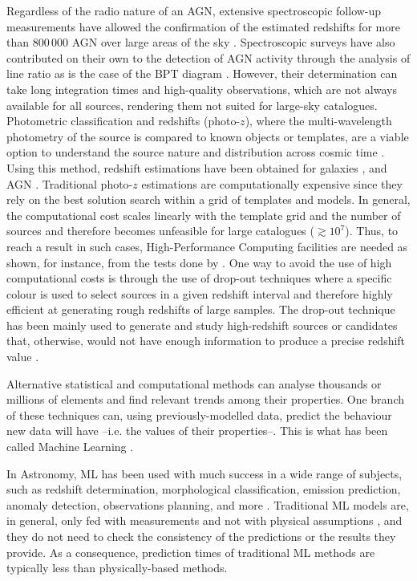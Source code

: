 \documentclass{aa}
\begin{document}
Regardless of the radio nature of an AGN, extensive spectroscopic follow-up measurements have allowed the confirmation of the estimated redshifts for more than $800\,000$ AGN over large areas of the sky \citep{2021arXiv210512985F}. Spectroscopic surveys have also contributed on their own to the detection of AGN activity through the analysis of line ratio as is the case of the BPT diagram \citep*{1981PASP...93....5B}. However, their determination can take long integration times and high-quality observations, which are not always available for all sources, rendering them not suited for large-sky catalogues. Photometric classification and redshifts (photo-$z$), where the multi-wavelength photometry of the source is compared to known objects or templates, are a viable option to understand the source nature and distribution across cosmic time \citep{1957AJ.....62....6B, 2019NatAs...3..212S}. Using this method, redshift estimations have been obtained for galaxies \citep[e.g.][]{2021A&A...654A.101H}, and AGN \citep[e.g.][]{2017ApJ...850...66A}. Traditional photo-$z$ estimations are computationally expensive since they rely on the best solution search within a grid of templates and models. In general, the computational cost scales linearly with the template grid and the number of sources and therefore becomes unfeasible for large catalogues (${\gtrsim}10^{7}$). Thus, to reach a result in such cases, High-Performance Computing facilities are needed as shown, for instance, from the tests done by \citet{2021ApJ...916...43G}. One way to avoid the use of high computational costs is through the use of drop-out techniques where a specific colour is used to select sources in a given redshift interval and therefore highly efficient at generating rough redshifts of large samples. The drop-out technique has been mainly used to generate and study high-redshift sources or candidates that, otherwise, would not have enough information to produce a precise redshift value \citep[e.g.][]{2020ApJ...902..112B, 2020A&A...633A.160C, 2022arXiv221106915S}.

Alternative statistical and computational methods can analyse thousands or millions of elements and find relevant trends among their properties. One branch of these techniques can, using previously-modelled data, predict the behaviour new data will have --i.e. the values of their properties--. This is what has been called Machine Learning \citep[ML;][]{5392560}.

In Astronomy, ML has been used with much success in a wide range of subjects, such as redshift determination, morphological classification, emission prediction, anomaly detection, observations planning, and more \citep[e.g.][]{2010IJMPD..19.1049B, 2019arXiv190407248B}. Traditional ML models are, in general, only fed with measurements and not with physical assumptions \citep{Desai2021}, and they do not need to check the consistency of the predictions or the results they provide. As a consequence, prediction times of traditional ML methods are typically less than physically-based methods.
\end{document}

